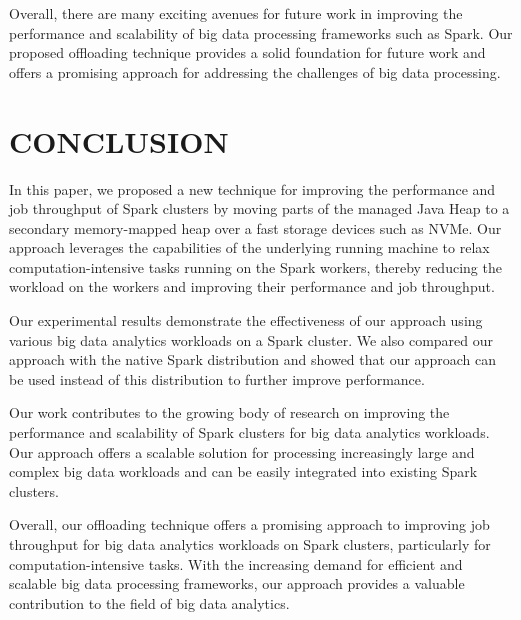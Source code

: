 \documentclass[twocolumn,10pt]{asme2e}
\begin{document}
Overall, there are many exciting avenues for future work in improving the performance and scalability of big data processing frameworks such as Spark. Our proposed offloading technique provides a solid foundation for future work and offers a promising approach for addressing the challenges of big data processing.

\section*{CONCLUSION}

In this paper, we proposed a new technique for improving the performance and job throughput of Spark clusters by moving parts of the managed Java Heap to a secondary memory-mapped heap over a fast storage devices such as NVMe. Our approach leverages the capabilities of the underlying running machine to relax computation-intensive tasks running on the Spark workers, thereby reducing the workload on the workers and improving their performance and job throughput.

Our experimental results demonstrate the effectiveness of our approach using various big data analytics workloads on a Spark cluster. We also compared our approach with the native Spark distribution and showed that our approach can be used instead of this distribution to further improve performance.

Our work contributes to the growing body of research on improving the performance and scalability of Spark clusters for big data analytics workloads. Our approach offers a scalable solution for processing increasingly large and complex big data workloads and can be easily integrated into existing Spark clusters.

Overall, our offloading technique offers a promising approach to improving job throughput for big data analytics workloads on Spark clusters, particularly for computation-intensive tasks. With the increasing demand for efficient and scalable big data processing frameworks, our approach provides a valuable contribution to the field of big data analytics.




\begin{acknowledgment}
\end{acknowledgment}
\end{document}
